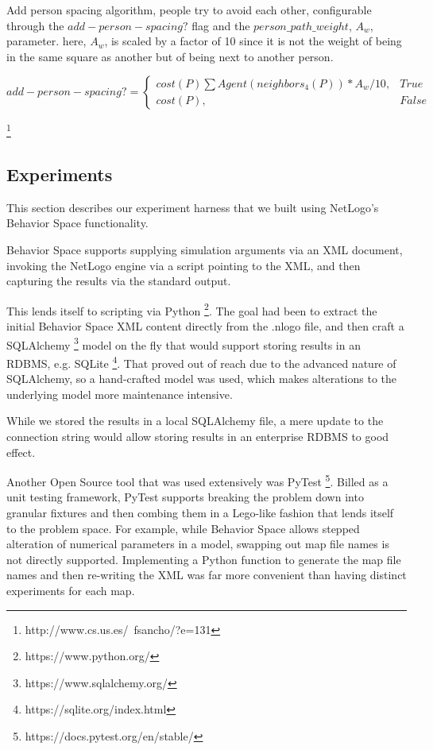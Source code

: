 \documentclass[12pt,letterpaper]{article}
\begin{document}
Add person spacing algorithm, people try to avoid each other, configurable through the $add-person-spacing?$ flag and the $person\_path\_weight$, $A_w$, parameter.  here, $A_w$, is scaled by a factor of 10 since it is not the weight of being in the same square as another but of being next to another person.

\begin{equation}
add-person-spacing?=
\begin{cases}
	cost(P) \sum Agent(neighbors_4(P)) * A_w / 10, & True \\
	cost(P), & False
\end{cases}
\end{equation}

\cite{mirahmadiNovelAlgorithmRealtime2012}
\footnote{http://www.cs.us.es/~fsancho/?e=131}

\subsection{Experiments}

This section describes our experiment harness that we built using NetLogo's
Behavior Space functionality.

Behavior Space supports supplying simulation arguments via an XML document,
invoking the NetLogo engine via a script pointing to the XML, and then capturing
the results via the standard output.

This lends itself to scripting via Python \footnote{https://www.python.org/}. The goal had been to extract the
initial Behavior Space XML content directly from the .nlogo file, and then craft
a SQLAlchemy \footnote{https://www.sqlalchemy.org/} model on the fly that would support storing results in an RDBMS,
e.g. SQLite \footnote{https://sqlite.org/index.html}. That proved out of reach due to the advanced nature of SQLAlchemy,
so a hand-crafted model was used, which makes alterations to the underlying
model more maintenance intensive.

While we stored the results in a local SQLAlchemy file, a mere update to the
connection string would allow storing results in an enterprise RDBMS to good
effect.

Another Open Source tool that was used extensively was PyTest \footnote{https://docs.pytest.org/en/stable/}. Billed as a
unit testing framework, PyTest supports breaking the problem down into granular
fixtures and then combing them in a Lego-like fashion that lends itself to the
problem space. For example, while Behavior Space allows stepped alteration of
numerical parameters in a model, swapping out map file names is not directly
supported. Implementing a Python function to generate the map file names and
then re-writing the XML was far more convenient than having distinct
experiments for each map.
\end{document}
